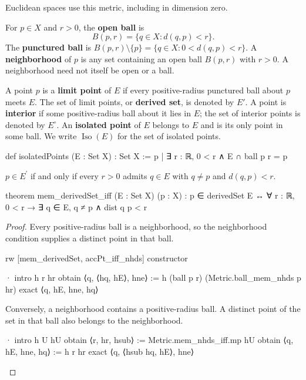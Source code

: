 Euclidean spaces use this metric, including in dimension zero.

\begin{definition}
  \label{ma:def:neighborhood-open-ball}
  For $p\in X$ and $r>0$, the \textbf{open ball} is
  \[
    B(p,r)=\{q\in X:d(q,p)<r\}.
  \]
  The \textbf{punctured ball} is $B(p,r)\setminus\{p\}=\{q\in X:0<d(q,p)<r\}$.
  A \textbf{neighborhood} of $p$ is any set containing an open ball $B(p,r)$ with $r>0$.
  A neighborhood need not itself be open or a ball.
\end{definition}

\begin{definition}
  \label{ma:def:limit-interior-isolated-points}
  A point $p$ is a \textbf{limit point} of $E$ if every positive-radius punctured ball about $p$
  meets $E$.
  The set of limit points, or \textbf{derived set}, is denoted by $E'$.
  A point is \textbf{interior} if some positive-radius ball about it lies in $E$; the set of
  interior points is denoted by $E^\circ$.
  An \textbf{isolated point} of $E$ belongs to $E$ and is its only point in some ball.
  We write $\operatorname{Iso}(E)$ for the set of isolated points.
  \begin{lean}
    def isolatedPoints (E : Set X) : Set X :=
      {p | ∃ r : ℝ, 0 < r ∧ E ∩ ball p r = {p}}
  \end{lean}
\end{definition}

\begin{lemma}
  \label{ma:lem:mem-derivedSet-iff}
  $p\in E^{\prime}$ if and only if every $r>0$ admits $q\in E$ with $q\ne p$ and $d(q,p)<r$.

  \begin{lean}
    theorem mem_derivedSet_iff (E : Set X) (p : X) :
        p ∈ derivedSet E ↔ ∀ r : ℝ, 0 < r → ∃ q ∈ E, q ≠ p ∧ dist q p < r
  \end{lean}
\end{lemma}

\begin{proof}
  Every positive-radius ball is a neighborhood, so the neighborhood condition supplies a distinct
  point in that ball.

  \begin{lean}
    rw [mem_derivedSet, accPt_iff_nhds]
    constructor

    · intro h r hr
      obtain ⟨q, ⟨hq, hE⟩, hne⟩ := h (ball p r) (Metric.ball_mem_nhds p hr)
      exact ⟨q, hE, hne, hq⟩
  \end{lean}

  Conversely, a neighborhood contains a positive-radius ball.
  A distinct point of the set in that ball also belongs to the neighborhood.

  \begin{lean}
    · intro h U hU
      obtain ⟨r, hr, hsub⟩ := Metric.mem_nhds_iff.mp hU
      obtain ⟨q, hE, hne, hq⟩ := h r hr
      exact ⟨q, ⟨hsub hq, hE⟩, hne⟩
  \end{lean}
\end{proof}

